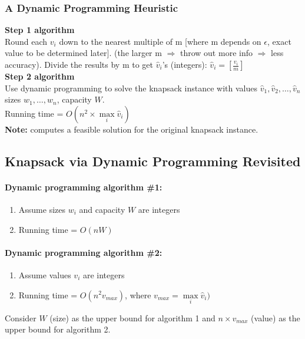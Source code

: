 \documentclass{scrartcl}
\begin{document}
\subsubsection{A Dynamic Programming Heuristic}
\label{sec:18-4-1}
{\bf Step 1 algorithm }\\
Round each $v_i$ down to the nearest multiple of m [where m depends on
$\epsilon$, exact value to be determined later].
(the larger m $\Rightarrow$ throw out more info $\Rightarrow$ less accuracy). 
Divide the results by m to get $\hat{v}_i$'s (integers): $\hat{v}_i =
[\frac{v_i}m]$ \\
{\bf Step 2 algorithm }\\
Use dynamic programming to solve the knapsack instance with values $\hat{v}_1,
\hat{v}_2, \dots, \hat{v}_n$ sizes $w_1, \dots, w_n$, capacity $W$.\\
Running time = $O(n^2 \times \max \limits_i \hat{v}_i)$\\
{\bf Note: } computes a feasible solution for the original knapsack instance.\\ 
\subsection{Knapsack via Dynamic Programming Revisited}
\label{sec:18-5}
\paragraph{Dynamic programming algorithm \#1: } 
\begin{enumerate}
\item Assume sizes $w_i$ and capacity $W$ are integers
\item Running time = $O(nW)$
\end{enumerate}
\paragraph{Dynamic programming algorithm \#2: } 
\begin{enumerate}
\item Assume values $v_i$ are integers
\item Running time = $O(n^2v_{max})$, where $v_{max}=\max \limits_i
  \hat{v}_i)$\\
\end{enumerate}
Consider $W$ (size) as the upper bound for algorithm 1  and $n \times v_{max}$
(value) as the upper bound for algorithm 2.
\end{document}

